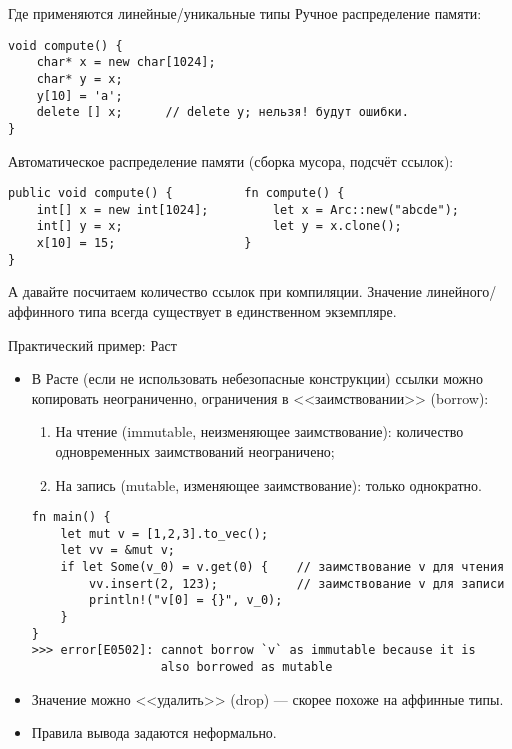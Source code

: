 \documentclass[aspectratio=169,dvipsnames,usenames]{beamer}
\begin{document}
\begin{frame}[fragile]{Где применяются линейные/уникальные типы}
Ручное распределение памяти:
\begin{verbatim}
void compute() {
    char* x = new char[1024];
    char* y = x;
    y[10] = 'a';
    delete [] x;      // delete y; нельзя! будут ошибки.
}
\end{verbatim}

Автоматическое распределение памяти (сборка мусора, подсчёт ссылок):
\begin{verbatim}
public void compute() {          fn compute() {
    int[] x = new int[1024];         let x = Arc::new("abcde");
    int[] y = x;                     let y = x.clone();
    x[10] = 15;                  }
}
\end{verbatim}

А давайте посчитаем количество ссылок при компиляции. Значение линейного/аффинного типа всегда существует в единственном экземпляре.
\end{frame}

\begin{frame}[fragile]{Практический пример: Раст}
\begin{itemize}
\item В Расте (если не использовать небезопасные конструкции) ссылки
можно копировать неограниченно, ограничения в <<заимствовании>> (borrow):
\begin{enumerate}
\item На чтение (immutable, неизменяющее заимствование): количество одновременных заимствований неограничено;
\item На запись (mutable, изменяющее заимствование): только однократно.
\end{enumerate}
{\small
\begin{verbatim}
fn main() {
    let mut v = [1,2,3].to_vec();
    let vv = &mut v;
    if let Some(v_0) = v.get(0) {    // заимствование v для чтения
        vv.insert(2, 123);           // заимствование v для записи
        println!("v[0] = {}", v_0);
    }
}
>>> error[E0502]: cannot borrow `v` as immutable because it is 
                  also borrowed as mutable
\end{verbatim}
}
\item Значение можно <<удалить>> (drop) --- скорее похоже на аффинные типы.
\item Правила вывода задаются неформально.
\end{itemize}
\end{frame}
\end{document}
